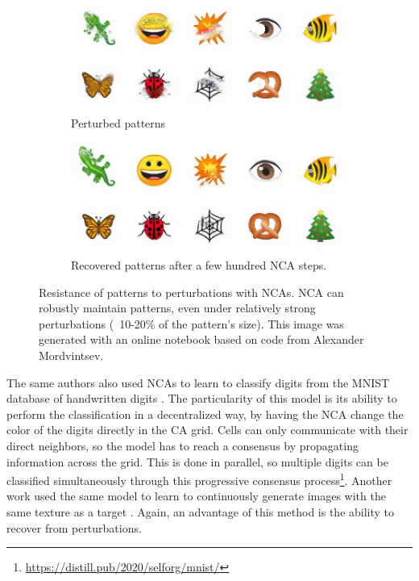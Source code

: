 \begin{figure}[htbp]
  \centering
  \begin{subfigure}[t]{.49\linewidth}
    \centering
    \includegraphics[width=\linewidth]{figures/nca_perturb.png}
    \caption{Perturbed patterns}
    \label{fig:nca_perturb}
  \end{subfigure}
  \begin{subfigure}[t]{.49\linewidth}
    \centering
    \includegraphics[width=\linewidth]{figures/nca_recover.png}
    \caption{Recovered patterns after a few hundred \ac{NCA} steps.}
    \label{fig:nca_recover}
  \end{subfigure}
  \caption[Resistance of patterns]{Resistance of patterns to perturbations with
    \acp{NCA}. \ac{NCA} can robustly maintain patterns, even under relatively
    strong perturbations (~10-20\% of the pattern's size). This image was
    generated with an online notebook based on code from Alexander
    Mordvintsev\footnotemark.}
  \label{fig:nca}
\end{figure}

The same authors also used \acp{NCA} to learn to classify digits from the MNIST
database of handwritten digits
\parencite{randazzoSelfclassifyingMNISTDigits2020}. The particularity of this
model is its ability to perform the classification in a decentralized way, by
having the \ac{NCA} change the color of the digits directly in the \ac{CA} grid.
Cells can only communicate with their direct neighbors, so the model has to
reach a consensus by propagating information across the grid. This is done in
parallel, so multiple digits can be classified simultaneously through this
progressive consensus
process\footnote{\url{https://distill.pub/2020/selforg/mnist/}}.
Another work used the same model to learn to continuously generate images with
the same texture as a target \parencite{niklassonSelfOrganisingTextures2021}.
Again, an advantage of this method is the ability to recover from perturbations.

